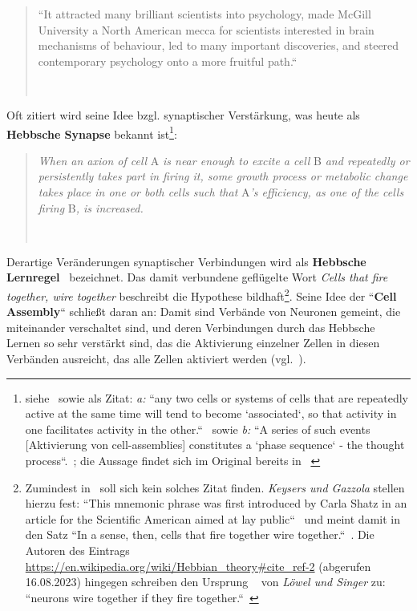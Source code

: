 \blockquote[{~\cite[1]{Kle99}}]{
    ``It attracted many
    brilliant scientists into psychology, made McGill University a North American mecca for scientists interested in brain mechanisms of behaviour, led to many important discoveries, and steered contemporary psychology onto a more fruitful path.``
}

Oft zitiert wird seine Idee bzgl. synaptischer Verstärkung, was heute als \textbf{Hebbsche Synapse} bekannt ist\footnote{
    siehe~\cite[43]{AR88} sowie als Zitat: \textit{a:} ``any two cells or systems of cells that are repeatedly active at the same time will tend to become `associated`, so that activity in one facilitates activity in the other.``~\cite[52]{Heb88} sowie \textit{b:} ``A series of such events [Aktivierung von cell-assemblies] constitutes a `phase sequence` - the thought process``.~\cite[48]{Heb88}; die Aussage findet sich im Original bereits in ~\cite[xi-xix, ``Introduction``]{Heb49}
}:

\blockquote[{~\cite[50; Hervorhebung i.O.]{Heb88}}]{
    \textit{When an axion of cell} A \textit{is near enough to excite a cell} B \textit{and repeatedly or persistently takes part in firing it, some growth process or metabolic change takes place in one or both cells such that} A\textit{'s efficiency, as one of the cells firing} B\textit{, is increased.}
}


Derartige Veränderungen synaptischer Verbindungen wird als \textbf{Hebbsche Lernregel}~\cite[985]{BCP18} bezeichnet.
Das damit verbundene geflügelte Wort \textit{Cells that fire together, wire together} beschreibt die Hypothese bildhaft\footnote{
    Zumindest in~\cite{Heb49} soll sich kein solches Zitat finden. \textit{Keysers und Gazzola} stellen hierzu fest: ``This mnemonic phrase was first introduced by Carla Shatz in an article for the Scientific American aimed at lay public``~\cite[2, Fussnotenmarker entfernt]{KG14} und meint damit in~\cite{Sha92} den Satz ``In a sense, then, cells that fire together wire together.``~\cite[64]{Sha92}. Die Autoren des Eintrags \url{https://en.wikipedia.org/wiki/Hebbian\_theory\#cite\_ref-2} (abgerufen 16.08.2023) hingegen schreiben den Ursprung ~\cite{LS92} von \textit{Löwel und Singer} zu: ``neurons wire together if they fire together.``~\cite[211]{LS92}
}.
Seine Idee der ``\textbf{Cell Assembly}`` schließt daran an: Damit sind Verbände von Neuronen gemeint, die miteinander verschaltet sind, und deren Verbindungen durch das Hebbsche Lernen so sehr verstärkt sind, das die Aktivierung einzelner Zellen in diesen Verbänden ausreicht, das alle Zellen aktiviert werden (vgl.~\cite[907 f.]{BCP18}).

